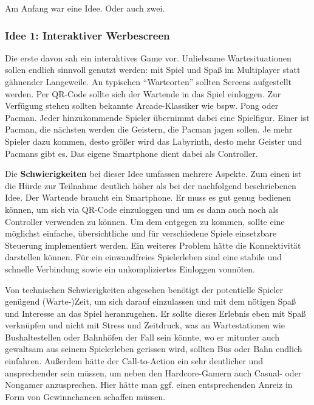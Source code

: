 
Am Anfang war eine Idee. Oder auch zwei.

\subsubsection{Idee 1: Interaktiver Werbescreen}

Die erste davon sah ein interaktives Game vor. Unliebsame Wartesituationen sollen endlich sinnvoll genutzt werden: mit Spiel und Spaß im Multiplayer statt gähnender Langeweile. An typischen \enquote{Warteorten} sollten Screens aufgestellt werden. Per QR-Code sollte sich der Wartende in das Spiel einloggen. Zur Verfügung stehen sollten bekannte Arcade-Klassiker wie bspw. Pong oder Pacman. Jeder hinzukommende Spieler übernimmt dabei eine Spielfigur. Einer ist Pacman, die nächsten werden die Geistern, die Pacman jagen sollen. Je mehr Spieler dazu kommen, desto größer wird das Labyrinth, desto mehr Geister und Pacmans gibt es. Das eigene Smartphone dient dabei als Controller.

Die \textbf{Schwierigkeiten} bei dieser Idee umfassen mehrere Aspekte. Zum einen ist die Hürde zur Teilnahme deutlich höher als bei der nachfolgend beschriebenen Idee. Der Wartende braucht ein Smartphone. Er muss es gut genug bedienen können, um sich via QR-Code einzuloggen und um es dann auch noch als Controller verwenden zu können. Um dem entgegen zu kommen, sollte eine möglichst einfache, übersichtliche und für verschiedene Spiele einsetzbare Steuerung implementiert werden. Ein weiteres Problem hätte die Konnektivität darstellen können. Für ein einwandfreies Spielerleben sind eine stabile und schnelle Verbindung sowie ein unkompliziertes Einloggen vonnöten.

Von technischen Schwierigkeiten abgesehen benötigt der potentielle Spieler genügend (Warte-)Zeit, um sich darauf einzulassen und mit dem nötigen Spaß und Interesse an das Spiel heranzugehen. Er sollte dieses Erlebnis eben mit Spaß verknüpfen und nicht mit Stress und Zeitdruck, was an Wartestationen wie Bushaltestellen oder Bahnhöfen der Fall sein könnte, wo er mitunter auch gewaltsam aus seinem Spielerleben gerissen wird, sollten Bus oder Bahn endlich einfahren. Außerdem hätte der Call-to-Action ein sehr deutlicher und ansprechender sein müssen, um neben den Hardcore-Gamern auch Casual- oder Nongamer anzusprechen. Hier hätte man ggf. einen entsprechenden Anreiz in Form von Gewinnchancen schaffen müssen.

